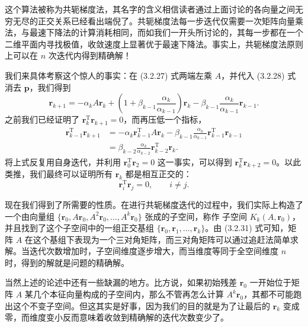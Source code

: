 这个算法被称为共轭梯度法，其名字的含义相信读者通过上面讨论的各向量之间无穷无尽的正交关系已经看出端倪了。共轭梯度法每一步迭代仅需要一次矩阵向量乘法，与最速下降法的计算消耗相同，而如我们一开头所讨论的，其每一步都在一个二维平面内寻找极值，收敛速度上显著优于最速下降法。事实上，共轭梯度法原则上可以在 $n$ 次迭代内得到精确解！

我们来具体考察这个惊人的事实：在 (3.2.27) 式两端左乘 $A$，并代入 (3.2.28) 式消去 $\bm p$，我们得到
\begin{equation}
\bm r_{k+1}=-\alpha_kA\bm r_k+
\left(1+\beta_{k-1}\frac{\alpha_k}{\alpha_{k-1}}\right)\bm r_k
-\beta_{k-1}\frac{\alpha_k}{\alpha_{k-1}}\bm r_{k-1}.
\tag{3.2.31}
\end{equation}
之前我们已经证明了 $\bm r_k^{\mathrm T}\bm r_{k+1}=0$，而再压低一个指标，
\begin{equation}
\begin{aligned}
\bm r_{k-1}^{\mathrm T}\bm r_{k+1}
&=-\alpha_k\bm r_{k-1}^{\mathrm T}A\bm r_k
-\beta_{k-1}\frac{\alpha_k}{\alpha_{k-1}}\bm r_{k-1}^{\mathrm T}\bm r_{k-1}\\
&=\beta_{k-2}\frac{\alpha_k}{\alpha_{k-2}}\bm r_{k-2}^{\mathrm T}\bm r_k.
\end{aligned}
\tag{3.2.32}
\end{equation}
将上式反复用自身迭代，并利用 $\bm r_0^{\mathrm T}\bm r_2=0$ 这一事实，可以得到 $\bm r_k^{\mathrm T}\bm r_{k+2}=0$。以此类推，我们最终可以证明所有 $\bm r_k$ 都是相互正交的：
\begin{equation}
\bm r_i^{\mathrm T}\bm r_j=0,\qquad i\ne j.
\tag{3.2.33}
\end{equation}

现在我们得到了所需要的性质。在进行共轭梯度迭代的过程中，我们实际上构造了一个由向量组 $\{\bm r_0,A\bm r_0,A^2\bm r_0,\ldots,A^k\bm r_0\}$ 张成的子空间，称作  子空间 $K_k(A,\bm r_0)$，并且找到了这个子空间中的一组正交基组 $\{\bm r_0,\bm r_1,\ldots,\bm r_k\}$。由 (3.2.31) 式可知，矩阵 $A$ 在这个基组下表现为一个三对角矩阵，而三对角矩阵可以通过追赶法简单求解。当迭代次数增加时，子空间维度逐步增大，而当维度等同于全空间维度 $n$ 时，得到的解就是问题的精确解。

当然上述的论述中还有一些缺漏的地方。比方说，如果初始残差 $\bm r_0$ 一开始位于矩阵 $A$ 某几个本征向量构成的子空间内，那么不管再怎么计算 $A^k\bm r_0$，其都不可能跑出这个不变子空间。但这其实是好事，因为我们的目的就是为了让最后的 $\bm r_k$ 变成零，而维度变小反而意味着收敛到精确解的迭代次数变少了。

